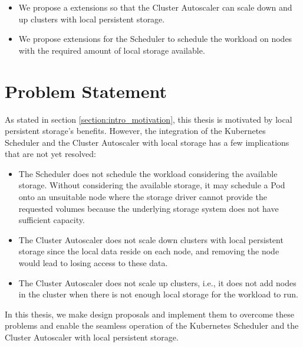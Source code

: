 \begin{itemize}
      \item We propose a extensions so that the Cluster Autoscaler can scale
            down and up clusters with local persistent storage.
      \item We propose extensions for the Scheduler to schedule the workload on
            nodes with the required amount of local storage available.
\end{itemize}


\section{Problem Statement} \label{section:intro_problem_statement}

As stated in section \ref{section:intro_motivation}, this thesis is motivated by
local persistent storage's benefits. However, the integration of the Kubernetes
Scheduler and the Cluster Autoscaler with local storage has a few implications
that are not yet resolved:
\begin{itemize}
      \tightlist
      \item The Scheduler does not schedule the workload considering the
            available storage. Without considering the available storage, it may
            schedule a Pod onto an unsuitable node where the storage driver
            cannot provide the requested volumes because the underlying storage
            system does not have sufficient capacity.
      \item The Cluster Autoscaler does not scale down clusters with local
            persistent storage since the local data reside on each node, and
            removing the node would lead to losing access to these data.
      \item The Cluster Autoscaler does not scale up clusters, i.e., it does not
            add nodes in the cluster when there is not enough local storage for
            the workload to run.
\end{itemize}

In this thesis, we make design proposals and implement them to overcome these
problems and enable the seamless operation of the Kubernetes Scheduler and the
Cluster Autoscaler with local persistent storage.



